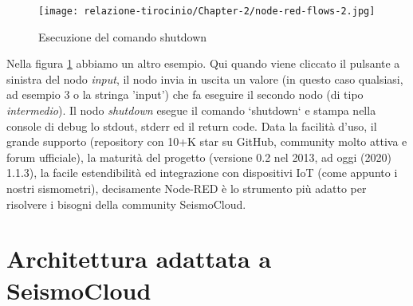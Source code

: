 \documentclass[a4paper,10pt]{memoir}
\begin{document}
\begin{figure}[H]
\caption{Esecuzione del comando shutdown}
\label{fig:node-red-flows-example2}
\texttt{[image: relazione-tirocinio/Chapter-2/node-red-flows-2.jpg]}
\end{figure}
Nella figura \ref{fig:node-red-flows-example2} abbiamo un altro esempio. Qui quando viene cliccato il pulsante a sinistra del nodo \textit{input}, il nodo invia in uscita un valore (in questo caso qualsiasi, ad esempio 3 o la stringa 'input') che fa eseguire il secondo nodo (di tipo \textit{intermedio}). Il nodo \textit{shutdown} esegue il comando `shutdown` e stampa nella console di debug lo stdout, stderr ed il return code.
Data la facilità d'uso, il grande supporto (repository con 10+K star su GitHub, community molto attiva e forum ufficiale), la maturità del progetto (versione 0.2 nel 2013, ad oggi (2020) 1.1.3), la facile estendibilità ed integrazione con dispositivi IoT (come appunto i nostri sismometri), decisamente Node-RED è lo strumento più adatto per risolvere i bisogni della community SeismoCloud.

\clearpage

\section{Architettura adattata a SeismoCloud}
\end{document}
